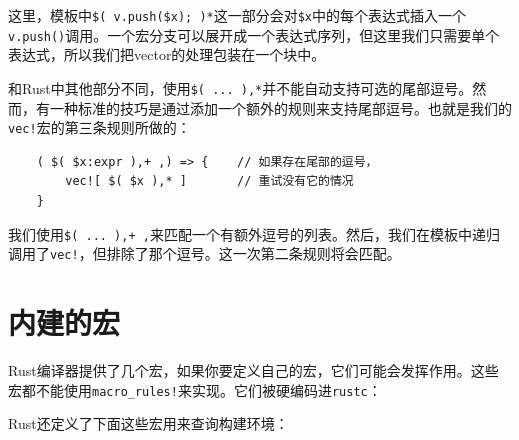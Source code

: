 这里，模板中\texttt{\$( v.push(\$x); )*}这一部分会对\texttt{\$x}中的每个表达式插入一个\texttt{v.push()}调用。一个宏分支可以展开成一个表达式序列，但这里我们只需要单个表达式，所以我们把vector的处理包装在一个块中。

和Rust中其他部分不同，使用\texttt{\$( ... ),*}并不能自动支持可选的尾部逗号。然而，有一种标准的技巧是通过添加一个额外的规则来支持尾部逗号。也就是我们的\texttt{vec!}宏的第三条规则所做的：
\begin{verbatim}
    ( $( $x:expr ),+ ,) => {    // 如果存在尾部的逗号，
        vec![ $( $x ),* ]       // 重试没有它的情况
    }
\end{verbatim}

我们使用\texttt{\$( ... ),+ ,}来匹配一个有额外逗号的列表。然后，我们在模板中递归调用了\texttt{vec!}，但排除了那个逗号。这一次第二条规则将会匹配。

\section{内建的宏}
Rust编译器提供了几个宏，如果你要定义自己的宏，它们可能会发挥作用。这些宏都不能使用\texttt{macro\_rules!}来实现。它们被硬编码进\texttt{rustc}：










Rust还定义了下面这些宏用来查询构建环境：


